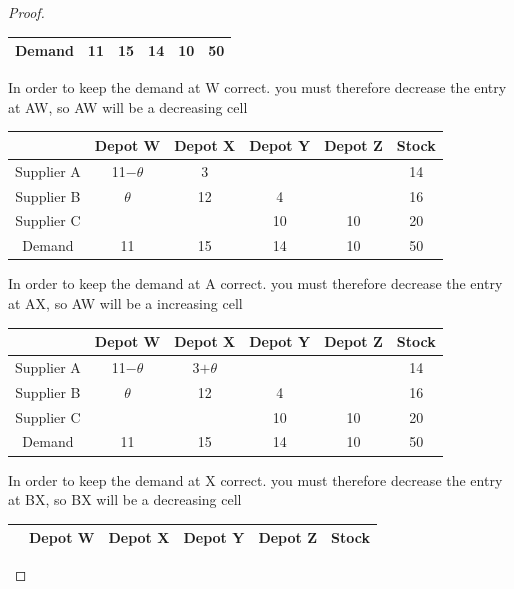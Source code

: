 \documentclass[a4paper]{article}
\begin{document}
\begin{eg}
\begin{proof}
\begin{center}
\begin{tabular}{|c|c|c|c|c|c|}
				\hline
				Demand     & 11       & 15      & 14      & 10      & 50    \\
				\hline
			\end{tabular}
		\end{center}
		In order to keep the demand at W correct. you must therefore decrease the entry at AW, so AW will be a decreasing cell
		\begin{center}
			\begin{tabular}{|c|c|c|c|c|c|}
				\hline
				           & Depot W     & Depot X & Depot Y & Depot Z & Stock \\
				\hline
				Supplier A & 11$-\theta$ & 3       &         &         & 14    \\
				\hline
				Supplier B & $\theta$    & 12      & 4       &         & 16    \\
				\hline
				Supplier C &             &         & 10      & 10      & 20    \\
				\hline
				Demand     & 11          & 15      & 14      & 10      & 50    \\
				\hline
			\end{tabular}
		\end{center}
		In order to keep the demand at A correct. you must therefore decrease the entry at AX, so AW will be a increasing cell
		\begin{center}
			\begin{tabular}{|c|c|c|c|c|c|}
				\hline
				           & Depot W     & Depot X    & Depot Y & Depot Z & Stock \\
				\hline
				Supplier A & 11$-\theta$ & 3$+\theta$ &         &         & 14    \\
				\hline
				Supplier B & $\theta$    & 12         & 4       &         & 16    \\
				\hline
				Supplier C &             &            & 10      & 10      & 20    \\
				\hline
				Demand     & 11          & 15         & 14      & 10      & 50    \\
				\hline
			\end{tabular}
		\end{center}
		In order to keep the demand at X correct. you must therefore decrease the entry at BX, so BX will be a decreasing cell
		\begin{center}
			\begin{tabular}{|c|c|c|c|c|c|}
				\hline
				           & Depot W     & Depot X     & Depot Y & Depot Z & Stock \\
				\hline

\end{tabular}
\end{center}
\end{proof}
\end{eg}
\end{document}
